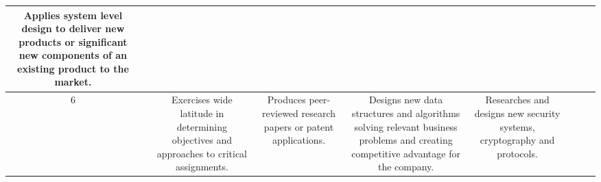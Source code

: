 \documentclass{article}
\begin{document}
{\begin{center}
\begin{tabular}{|C|C|C|C|C|C|C|C|C|}
    Applies system level design to deliver new products or significant new
    components of an existing product to the market.
    &

    \\ [13em]
  \hline
    6
    &

    &

    Exercises wide latitude in determining objectives and approaches to critical
    assignments.
    &

    Produces peer-reviewed research papers or patent applications.
    &

    Designs new data structures and algorithms solving relevant business
    problems and creating competitive advantage for the company.
    &

    Researches and designs new security systems, cryptography and protocols.
    &

    &

    &

    \\ [13em]
\end{tabular}
\end{center}

}
\end{document}
